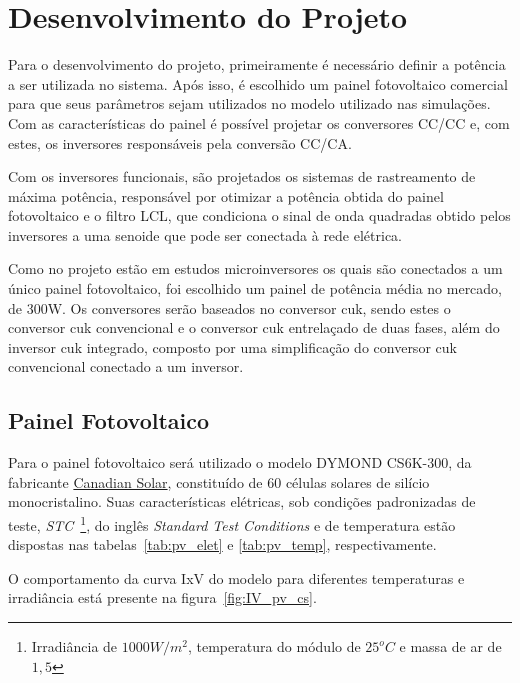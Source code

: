 \documentclass[
	12pt,				%
	openany,
	onseside,
	a4paper,			%
	english,			%
	french,				%
	spanish,			%
	brazil,				%
	]{abntex2}
\begin{document}

\chapter{Desenvolvimento do Projeto}  \label{cap:project}

Para o desenvolvimento do projeto, primeiramente é necessário definir a potência a ser utilizada no sistema. Após isso, é escolhido um painel fotovoltaico comercial para que seus parâmetros sejam utilizados no modelo utilizado nas simulações. Com as características do painel é possível projetar os conversores CC/CC e, com estes, os inversores responsáveis pela conversão CC/CA.

Com os inversores funcionais, são projetados os sistemas de rastreamento de máxima potência, responsável por otimizar a potência obtida do painel fotovoltaico e o filtro LCL, que condiciona o sinal de onda quadradas obtido pelos inversores a uma senoide que pode ser conectada à rede elétrica.

Como no projeto estão em estudos microinversores os quais são conectados a um único painel fotovoltaico, foi escolhido um painel de potência média no mercado, de 300W. Os conversores serão baseados no conversor cuk, sendo estes o conversor cuk convencional e o conversor cuk entrelaçado de duas fases, além do inversor cuk integrado, composto por uma simplificação do conversor cuk convencional conectado a um inversor.

\section{Painel Fotovoltaico}

Para o painel fotovoltaico será utilizado o modelo DYMOND CS6K-300, da fabricante \href{https://www.canadiansolar.com/en}{Canadian Solar}, constituído de 60 células solares de silício monocristalino. Suas características elétricas, sob condições padronizadas de teste, \emph{STC}~\footnote{\label{foot_:STC} Irradiância de $1000W/m^2$, temperatura do módulo de $25^oC$ e massa de ar de $1,5$}, do inglês \textit{Standard Test Conditions} e de temperatura estão dispostas nas tabelas~\ref{tab:pv_elet} e \ref{tab:pv_temp}, respectivamente.

O comportamento da curva IxV do modelo para diferentes temperaturas e irradiância está presente na figura~\ref{fig:IV_pv_cs}. 
\end{document}

